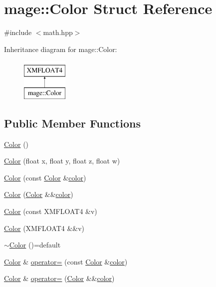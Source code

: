 \hypertarget{structmage_1_1_color}{}\section{mage\+:\+:Color Struct Reference}
\label{structmage_1_1_color}


{\ttfamily \#include $<$math.\+hpp$>$}

Inheritance diagram for mage\+:\+:Color\+:\begin{figure}[H]
\begin{center}
\leavevmode
\includegraphics[height=2.000000cm]{structmage_1_1_color}
\end{center}
\end{figure}
\subsection*{Public Member Functions}
\begin{DoxyCompactItemize}
\item 
\hyperlink{structmage_1_1_color_aacf48e59425346eb80e7592bbcd6b55d}{Color} ()
\item 
\hyperlink{structmage_1_1_color_ae906a0c456f1d21df8a6d5476918a913}{Color} (float x, float y, float z, float w)
\item 
\hyperlink{structmage_1_1_color_aabf202b6ec0c2d1fc788c9bc69f185ff}{Color} (const \hyperlink{structmage_1_1_color}{Color} \&\hyperlink{namespacemage_a8ac46837ac2f6a9b756e66979165acd6}{color})
\item 
\hyperlink{structmage_1_1_color_abb0838db7c77053894fcf11b03284549}{Color} (\hyperlink{structmage_1_1_color}{Color} \&\&\hyperlink{namespacemage_a8ac46837ac2f6a9b756e66979165acd6}{color})
\item 
\hyperlink{structmage_1_1_color_a90a9fab9b5dff127bf2ead12a46d531f}{Color} (const X\+M\+F\+L\+O\+A\+T4 \&v)
\item 
\hyperlink{structmage_1_1_color_a8f0d0c4359f6754d90bb2b6c077a11e3}{Color} (X\+M\+F\+L\+O\+A\+T4 \&\&v)
\item 
\hyperlink{structmage_1_1_color_aa4df1c9718b7846adf77fbeed79ac219}{$\sim$\+Color} ()=default
\item 
\hyperlink{structmage_1_1_color}{Color} \& \hyperlink{structmage_1_1_color_a006c8ce9bf69e54598c5981fe79d742c}{operator=} (const \hyperlink{structmage_1_1_color}{Color} \&\hyperlink{namespacemage_a8ac46837ac2f6a9b756e66979165acd6}{color})
\item 
\hyperlink{structmage_1_1_color}{Color} \& \hyperlink{structmage_1_1_color_afe64cf3cf65b5812ac35674917abb12c}{operator=} (\hyperlink{structmage_1_1_color}{Color} \&\&\hyperlink{namespacemage_a8ac46837ac2f6a9b756e66979165acd6}{color})
\end{DoxyCompactItemize}


